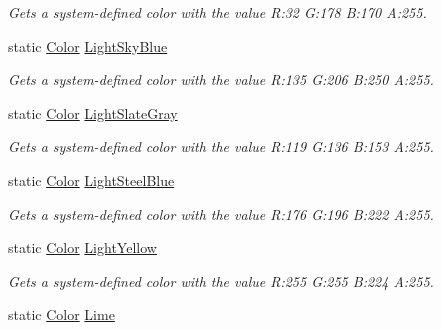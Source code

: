 \begin{DoxyCompactItemize}
\begin{DoxyCompactList}\small\item\em Gets a system-\/defined color with the value R\+:32 G\+:178 B\+:170 A\+:255.\end{DoxyCompactList}\item 
static \hyperlink{structMicrosoft_1_1Xna_1_1Framework_1_1Color}{Color} \hyperlink{structMicrosoft_1_1Xna_1_1Framework_1_1Color_ab9227c6825361244e29d04306cc0c1aa}{Light\+Sky\+Blue}
\begin{DoxyCompactList}\small\item\em Gets a system-\/defined color with the value R\+:135 G\+:206 B\+:250 A\+:255.\end{DoxyCompactList}\item 
static \hyperlink{structMicrosoft_1_1Xna_1_1Framework_1_1Color}{Color} \hyperlink{structMicrosoft_1_1Xna_1_1Framework_1_1Color_ab3f9fd80145e61e5406d709c93357868}{Light\+Slate\+Gray}
\begin{DoxyCompactList}\small\item\em Gets a system-\/defined color with the value R\+:119 G\+:136 B\+:153 A\+:255.\end{DoxyCompactList}\item 
static \hyperlink{structMicrosoft_1_1Xna_1_1Framework_1_1Color}{Color} \hyperlink{structMicrosoft_1_1Xna_1_1Framework_1_1Color_a1b1d72dc66dcf084723af79f17179049}{Light\+Steel\+Blue}
\begin{DoxyCompactList}\small\item\em Gets a system-\/defined color with the value R\+:176 G\+:196 B\+:222 A\+:255.\end{DoxyCompactList}\item 
static \hyperlink{structMicrosoft_1_1Xna_1_1Framework_1_1Color}{Color} \hyperlink{structMicrosoft_1_1Xna_1_1Framework_1_1Color_aa353ae3271496f961552cbe2f2e02f81}{Light\+Yellow}
\begin{DoxyCompactList}\small\item\em Gets a system-\/defined color with the value R\+:255 G\+:255 B\+:224 A\+:255.\end{DoxyCompactList}\item 
static \hyperlink{structMicrosoft_1_1Xna_1_1Framework_1_1Color}{Color} \hyperlink{structMicrosoft_1_1Xna_1_1Framework_1_1Color_a40ec9a7fb0a078cf351f9f49ae863605}{Lime}

\end{DoxyCompactItemize}
